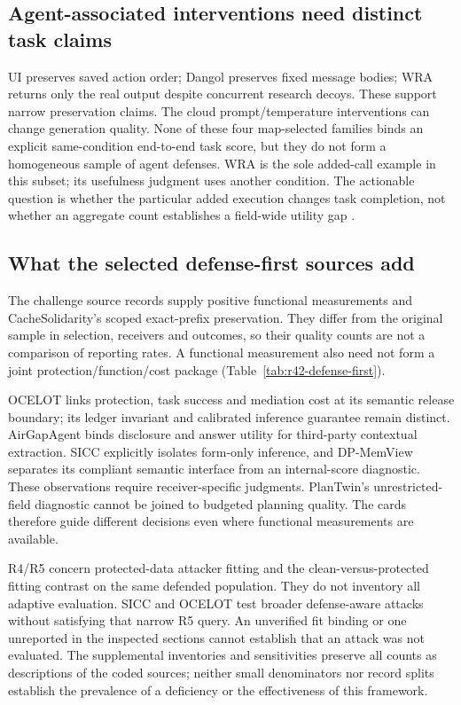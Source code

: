 \subsection{Agent-associated interventions need distinct task claims}
UI preserves saved action order; Dangol preserves fixed message bodies; WRA returns only the real output despite concurrent research decoys. These support narrow preservation claims. The cloud prompt/temperature interventions can change generation quality. None of these four map-selected families binds an explicit same-condition end-to-end task score, but they do not form a homogeneous sample of agent defenses. WRA is the sole added-call example in this subset; its usefulness judgment uses another condition. The actionable question is whether the particular added execution changes task completion, not whether an aggregate count establishes a field-wide utility gap \cite{uitraces2026,jeong2026wra,dangol2026workflow,pouryousef2026traffic}.

\subsection{What the selected defense-first sources add}
The challenge source records supply positive functional measurements and CacheSolidarity's scoped exact-prefix preservation. They differ from the original sample in selection, receivers and outcomes, so their quality counts are not a comparison of reporting rates. A functional measurement also need not form a joint protection/function/cost package (Table~\ref{tab:r42-defense-first}).

OCELOT links protection, task success and mediation cost at its semantic release boundary; its ledger invariant and calibrated inference guarantee remain distinct. AirGapAgent binds disclosure and answer utility for third-party contextual extraction. SICC explicitly isolates form-only inference, and DP-MemView separates its compliant semantic interface from an internal-score diagnostic. These observations require receiver-specific judgments. PlanTwin's unrestricted-field diagnostic cannot be joined to budgeted planning quality. The cards therefore guide different decisions even where functional measurements are available.


R4/R5 concern protected-data attacker fitting and the clean-versus-protected fitting contrast on the same defended population. They do not inventory all adaptive evaluation. SICC and OCELOT test broader defense-aware attacks without satisfying that narrow R5 query. An unverified fit binding or one unreported in the inspected sections cannot establish that an attack was not evaluated. The supplemental inventories and sensitivities preserve all counts as descriptions of the coded sources; neither small denominators nor record splits establish the prevalence of a deficiency or the effectiveness of this framework.

